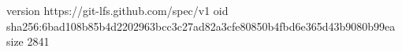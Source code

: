 version https://git-lfs.github.com/spec/v1
oid sha256:6bad108b85b4d2202963bcc3c27ad82a3cfe80850b4fbd6e365d43b9080b99ea
size 2841
